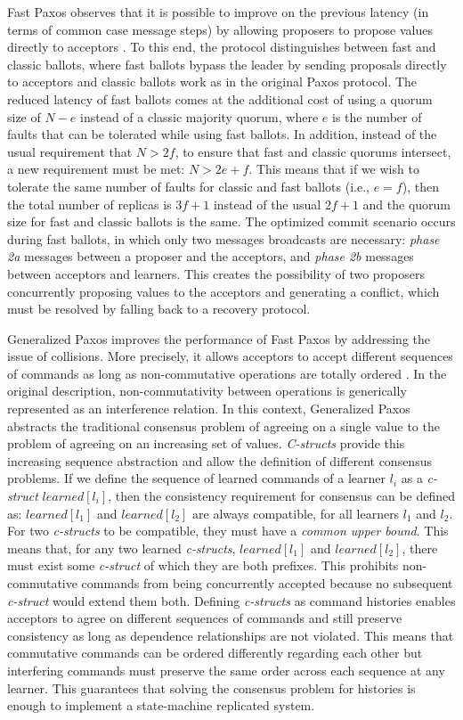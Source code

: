 Fast Paxos observes that it is possible to improve on the previous latency (in terms of common case message steps) by allowing proposers to propose values directly to acceptors \cite{L06}. To this end, the protocol distinguishes between fast and classic ballots, where fast ballots bypass the leader by sending proposals directly to acceptors and classic ballots work as in the original Paxos protocol. The reduced latency of fast ballots comes at the additional cost of using a quorum size of $N-e$ instead of a classic majority quorum, where $e$ is the number of faults that can be tolerated while using fast ballots. In addition, instead of the usual requirement that $N> 2f$, to ensure that fast and classic quorums intersect, a new requirement must be met: $N > 2e+f$. This means that if we wish to tolerate the same number of faults for classic and fast ballots (i.e., $e=f$), then the total number of replicas is $3f+1$ instead of the usual $2f+1$ and the quorum size for fast and classic ballots is the same. The optimized commit scenario occurs during fast ballots, in which only two messages broadcasts are necessary: \textit{phase 2a} messages between a proposer and the acceptors, and \textit{phase 2b} messages between acceptors and learners. This creates the possibility of two proposers concurrently proposing values to the acceptors and generating a conflict, which must be resolved by falling back to a recovery protocol. \par
Generalized Paxos improves the performance of Fast Paxos by addressing the issue of collisions. More precisely, it allows acceptors to accept different sequences of commands as long as non-commutative operations are totally ordered \cite{Lamport2005}. In the original description, non-commutativity between operations is generically represented as an interference relation. In this context, Generalized Paxos abstracts the traditional consensus problem of agreeing on a single value to the problem of agreeing on an increasing set of values. \textit{C-structs} provide this increasing sequence abstraction and allow the definition of different consensus problems. If we define the sequence of learned commands of a learner $l_i$ as a \textit{c-struct} $learned[l_i]$, then the consistency requirement for consensus can be defined as: $learned[l_1]$ and $learned[l_2]$ are always compatible, for all learners $l_1$ and $l_2$. For two \textit{c-structs} to be compatible, they must have a \textit{common upper bound}. This means that, for any two learned \textit{c-structs}, $learned[l_1]$ and $learned[l_2]$, there must exist some \textit{c-struct} of which they are both prefixes. This prohibits non-commutative commands from being concurrently accepted because no subsequent \textit{c-struct} would extend them both. Defining \textit{c-structs} as command histories enables acceptors to agree on different sequences of commands and still preserve consistency as long as dependence relationships are not violated. This means that commutative commands can be ordered differently regarding each other but interfering commands must preserve the same order across each sequence at any learner. This guarantees that solving the consensus problem for histories is enough to implement a state-machine replicated system. \par

